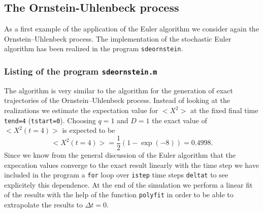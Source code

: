 \subsection{The Ornstein-Uhlenbeck process}
As a first example of the application of the Euler algorithm
we consider again the Ornstein--Uhlenbeck process.
The implementation of the stochastic Euler algorithm has been 
realized in the program \texttt{sdeornstein}.

\subsubsection{Listing of the program \texttt{sdeornstein.m}}

The algorithm is very similar to the algorithm for the generation 
of exact trajectories of the Ornstein--Uhlenbeck process. 
Instead of looking at the realizations we estimate the expectation
value for $<X^2>$ at the fixed final time \texttt{tend=4} 
(\texttt{tstart=0}). Choosing $q=1$ and $D=1$ the exact value of
$<X^2(t=4)>$ is expected to be
\begin{equation*}
<X^2(t=4)> = \frac{1}{2}(1-\exp(-8)) = 0.4998.
\end{equation*}
Since we know from the general discussion of the Euler algorithm
that the expecation values converge to the exact result linearly 
with the time step we have included in the program a \texttt{for}
loop over \texttt{istep} time steps \texttt{deltat} to see explicitely this
dependence. At the end of the simulation we perform a linear fit
of the results with the help of the function \texttt{polyfit} in 
order to be able to extrapolate the results to $\Delta t =0$.

